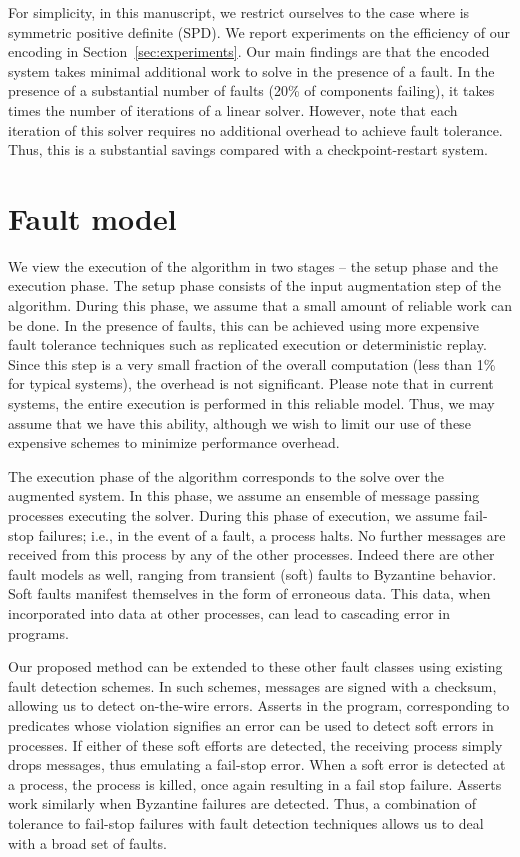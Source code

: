 \documentclass[11pt]{article}
\begin{document}
For simplicity, in this manuscript, we restrict ourselves to the case where 
is symmetric positive definite (SPD). We report experiments on the efficiency of
our encoding in Section~\ref{sec:experiments}. Our main findings are that the
encoded system takes minimal additional work to solve in the presence of a fault.
In the presence of a substantial number of faults (20\% of components failing), it
takes  times the number of iterations of a linear solver. However, note that each
iteration of this solver requires no additional overhead to achieve fault tolerance.
Thus, this is a substantial savings compared with a checkpoint-restart system. 

\section{Fault model} \label{sec:fault}

We view the execution of the algorithm in two stages -- the setup phase and the execution
phase. The setup phase consists of the input augmentation step of the algorithm. During
this phase, we assume that a small amount of reliable work can be done. In the presence of
faults, this can be achieved using more expensive fault tolerance techniques such as
replicated execution or deterministic replay. Since this step is a very small fraction of
the overall computation (less than 1\% for typical systems), the overhead is not 
significant. Please note that in current systems, the entire execution
is performed in this reliable model. Thus, we may assume that we have
this ability, although we wish to limit our use of these expensive schemes to minimize
performance overhead.

The execution phase of the algorithm corresponds to the solve over the augmented system.
In this phase, we assume an ensemble of message passing processes executing the solver.
During this phase of execution, we assume fail-stop failures; i.e., in the event of a
fault, a process halts. No further messages are received from this process by
any of the other processes. Indeed there are other fault models as well, ranging from
transient (soft) faults to Byzantine behavior. Soft faults manifest themselves
in the form of erroneous data. This data, when incorporated into data at other
processes, can lead to cascading error in programs.

Our proposed method can be extended to these other fault classes using existing
fault detection schemes. In such schemes, messages are signed with a checksum,
allowing us to detect on-the-wire errors. Asserts in the program, corresponding to
predicates whose violation signifies an error can be used to detect soft errors in
processes. If either of these soft efforts are detected, the receiving process
simply drops messages, thus emulating a fail-stop error. When a soft error is detected
at a process, the process is killed, once again resulting in a fail stop failure. Asserts
work similarly when Byzantine failures are detected. Thus, a combination of tolerance
to fail-stop failures with fault detection techniques allows us to deal with
a broad set of faults.
\end{document}

